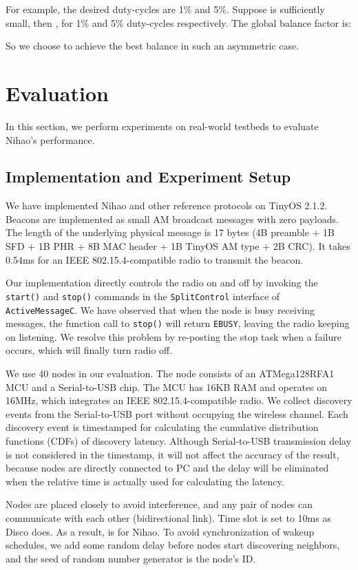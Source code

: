 \documentclass[conference]{IEEEtran}
\begin{document}
For example, the desired duty-cycles are 1\% and 5\%.
Suppose  is sufficiently small, then ,  for 1\% and 5\% duty-cycles respectively.
The global balance factor is:

So we choose  to achieve the best balance in such an asymmetric case.


\section{Evaluation}\label{evaluation}
In this section, we perform experiments on real-world testbeds to evaluate Nihao's performance.

\subsection{Implementation and Experiment Setup}
We have implemented Nihao and other reference protocols on TinyOS 2.1.2.
Beacons are implemented as small AM broadcast messages with zero payloads.
The length of the underlying physical message is 17 bytes (4B preamble + 1B SFD + 1B PHR + 8B MAC header + 1B TinyOS AM type + 2B CRC).
It takes 0.54ms for an IEEE 802.15.4-compatible radio to transmit the beacon.

Our implementation directly controls the radio on and off by invoking 
the \texttt{start()} and \texttt{stop()} commands in the \texttt{SplitControl} interface of \texttt{ActiveMessageC}.
We have observed that when the node is busy receiving messages,
the function call to \texttt{stop()} will return \texttt{EBUSY}, leaving the radio keeping on listening.
We resolve this problem by re-posting the stop task when a failure occurs, which will finally turn radio off.

We use 40 nodes in our evaluation.
The node consists of an ATMega128RFA1 MCU and a Serial-to-USB chip.
The MCU has 16KB RAM and operates on 16MHz, which integrates an IEEE 802.15.4-compatible radio.
We collect discovery events from the Serial-to-USB port without occupying the wireless channel.
Each discovery event is timestamped for calculating the cumulative distribution functions (CDFs) of discovery latency.
Although Serial-to-USB transmission delay is not considered in the timestamp,
it will not affect the accuracy of the result,
because nodes are directly connected to PC and the delay will be eliminated when the relative time is actually used for calculating the latency.

Nodes are placed closely to avoid interference, and any pair of nodes can communicate with each other (bidirectional link).
Time slot is set to 10ms as Disco does. As a result,  is  for Nihao.
To avoid synchronization of wakeup schedules, we add some random delay before nodes start discovering neighbors, and the seed of random number generator is the node's ID.
\end{document}

